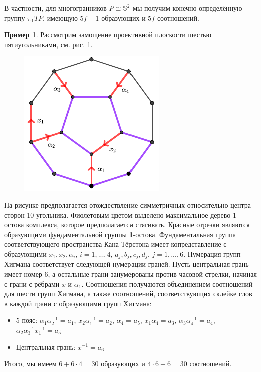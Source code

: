 \documentclass[14pt, dvipsnames, twoside]{extarticle}
\theoremstyle{definition}
\newtheorem{example}{Пример}
\theoremstyle{remark}
\begin{document}
В частности, для многогранников $P\cong \mathbb{S}^2$ мы получим конечно определённую группу $\pi_1TP$, имеющую $5f - 1$ образующих и $5f$ соотношений.














\begin{example}    

Рассмотрим замощение проективной плоскости шестью пятиугольниками, см. рис. \ref{pict_dodecahedron}. 

\begin{figure}
\begin{center}
\includegraphics[scale=1.9]{Dodecahedron.pdf}
\caption{}\label{pict_dodecahedron}
\end{center}
\end{figure}


На рисунке предполагается отождествление симметричных относительно центра сторон 10-угольника. Фиолетовым цветом выделено максимальное дерево 1-остова комплекса, которое предполагается стягивать. Красные отрезки являются образующими фундаментальной группы 1-остова. Фундаментальная группа соответствующего пространства Кана-Тёрстона имеет копредставление с образующими $x_1, x_2, \alpha_i$, $i=1,..., 4$, $a_j, b_j, c_j, d_j$, $j=1, ..., 6$. Нумерация групп Хигмана соответствует следующей нумерации граней. Пусть центральная грань имеет номер 6, а остальные грани занумерованы против часовой стрелки, начиная с грани с рёбрами $x$ и $\alpha_1$. Соотношения получаются объединением соотношений для шести групп Хигмана, а также соотношений, соответствующих склейке слов в каждой грани с образующими групп Хигмана: 


\begin{itemize}

\item 5-пояс: $\alpha_1\alpha_2^{-1} = a_1$, $x_2\alpha_1^{-1} = a_2$, $\alpha_4 = a_5$, $x_1\alpha_4 = a_3$, $\alpha_3\alpha_4^{-1} = a_4$, $\alpha_2\alpha_3^{-1}x_1^{-1} = a_5$

\item Центральная грань: $x^{-1} = a_6$

\end{itemize}


Итого, мы имеем $6 + 6\cdot 4 = 30$ образующих и $4\cdot 6 + 6 = 30$ соотношений.    

\end{example}
\end{document}
